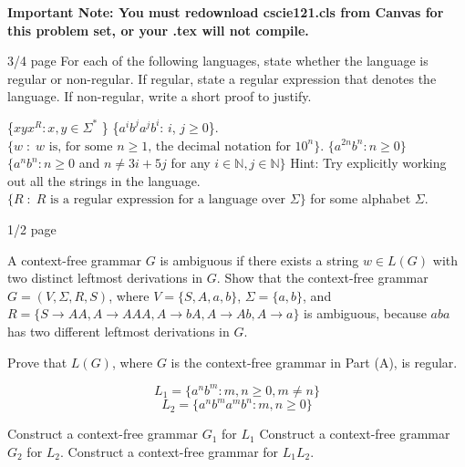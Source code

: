 \documentclass[solution, letterpaper]{cscie121}
\begin{document}

\textbf{Important Note: You must redownload cscie121.cls from Canvas for this problem set, or your .tex will not compile. }


 {3/4 page}
For each of the following languages, state whether the language is regular or non-regular. If regular, state a regular expression that denotes the language. If non-regular, write a short proof to justify.

\subproblem \{$xyx^R : x, y \in \Sigma^*$ \}
\subproblem \{$a^ib^ja^jb^i$: $i$, $j\geq0$\}.
\subproblem
$\{w\;:\;\textrm{$w$ is, for some $n\geq 1$, the decimal notation
for $10^n$}\}$. 
\subproblem $\{a^{2n}b^{n}: n\geq 0\}$
\subproblem $\{a^nb^n : n \geq 0$ and $n \neq 3i+5j$ for any $i \in \mathbb{N}, j \in \mathbb{N} \}$ Hint: Try explicitly working out all the strings in the language.
\subproblem $\{R\;:\;\textrm{$R$ is a regular expression for a
language over $\Sigma$}\}$ for some alphabet $\Sigma$.

\begin{solution}
\end{solution}

 {1/2 page}

\subproblem
A context-free grammar $G$ is ambiguous if there exists a
string $w \in L(G)$ with two distinct leftmost derivations in $G$. Show that the context-free grammar $G = (V, \Sigma, R, S)$, where
$V=\{S,A,a,b\}$, $\Sigma = \{a,b\}$, and $R = \{S \rightarrow AA, A
\rightarrow AAA, A \rightarrow bA, A \rightarrow Ab, A \rightarrow a\}$
is ambiguous, because $aba$ has two different leftmost derivations in 
$G$.

\subproblem
Prove that $L(G)$,
where $G$ is the context-free grammar in Part (A), is regular.


\begin{solution}
\end{solution}


$$ L_1 = \{a^nb^m : m,n \geq 0 , m \neq n\} $$
$$ L_2 =  \{a^nb^ma^mb^n : m,n \geq 0\} $$


\subproblem Construct a context-free grammar $G_1$ for $L_1$
\subproblem Construct a context-free grammar $G_2$ for $L_2$.
\subproblem Construct a context-free grammar for $L_1L_2$.

\begin{solution}
\end{solution}
\end{document}
